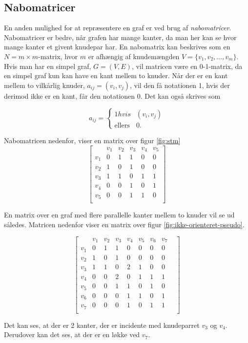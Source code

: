 \subsection{Nabomatricer}
En anden mulighed for at repræsentere en graf er ved brug af \emph{nabomatricer}. Nabomatricer er bedre, når grafen har mange kanter, da man her kan se hvor mange kanter et givent knudepar har.
En nabomatrix kan beskrives som en $N=m \times m$-matrix, hvor $m$ er afhængig af knudemængden $V=\{v_1, v_2, \dotsc, v_m\}$. Hvis man har en simpel graf, $G=(V,E)$, vil matricen være en 0-1-matrix, da en simpel graf kun kan have en kant mellem to knuder. Når der er en kant mellem to  vilkårlig knuder, $a_{ij}=(v_i,v_j)$,  vil den få notationen 1, hvis der derimod ikke er en kant, får den notationen 0.
Det kan også skrives som

\[ a_{ij} = \left\{ \begin{array}{ll}
         1  hvis & (v_i, v_j)\\
         \mbox{ellers} & 0.\end{array} \right. \]


Nabomatricen nedenfor, viser en matrix over figur \ref{fig:stm}
\begin{equation}
	\begin{bmatrix}
		&v_1&v_2&v_3&v_4&v_5 \\
		v_1&0&1&1&0&0 \\
		v_2&1&0&1&0&0 \\
		v_3&1&1&0&1&1 \\
		v_4&0&0&1&0&1 \\
		v_5&0&0&1&1&0 \\
	\end{bmatrix}
\end{equation}

En matrix over en graf med flere parallelle kanter mellem to knuder vil se ud således. Matricen nedenfor viser en matrix over figur \ref{fig:ikke-orienteret-pseudo}.

\begin{equation}
	\begin{bmatrix}
	&v_1&v_2&v_3&v_4&v_5&v_6&v_7& \\
	v_1&0&1&1&0&0&0&0 \\
	v_2&1&0&1&0&0&0&0 \\
	v_3&1&1&0&2&1&0&0 \\
	v_4&0&0&2&0&1&1&1 \\
	v_5&0&0&1&1&0&1&0 \\
	v_6&0&0&0&1&1&0&1 \\
	v_7&0&0&0&1&0&1&1 \\	
	\end{bmatrix}
\end{equation}

Det kan ses, at der er 2 kanter, der er incidente med knudeparret $v_3$ og $v_4$. Derudover kan det ses, at der er en løkke ved $v_7$.

